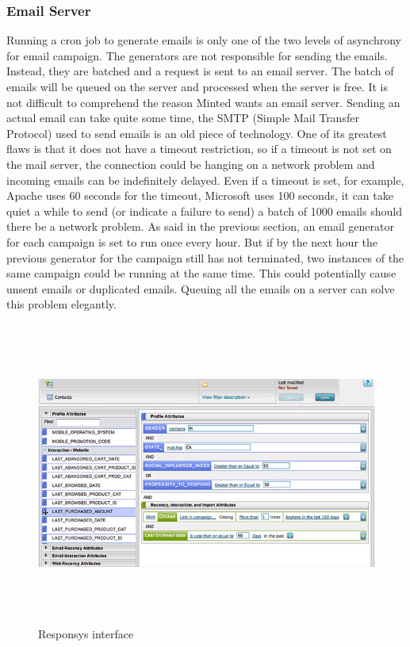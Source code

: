 \documentclass[12pt]{article}
\begin{document}
\subsubsection{Email Server}
Running a cron job to generate emails is only one of the two levels of asynchrony for email campaign. The generators are not responsible for sending the emails. Instead, they are batched and a request is sent to an email server. The batch of emails will be queued on the server and processed when the server is free. It is not difficult to comprehend the reason Minted wants an email server. Sending an actual email can take quite some time, the SMTP (Simple Mail Transfer Protocol) used to send emails is an old piece of technology. One of its greatest flaws is that it does not have a timeout restriction, so if a timeout is not set on the mail server, the connection could be hanging on a network problem and incoming emails can be indefinitely delayed. Even if a timeout is set, for example, Apache uses 60 seconds for the timeout, Microsoft uses 100 seconds,\cite{unit} \cite{maven} it can take quiet a while to send (or indicate a failure to send) a batch of 1000 emails should there be a network problem. As said in the previous section, an email generator for each campaign is set to run once every hour. But if by the next hour the previous generator for the campaign still has not terminated, two instances of the same campaign could be running at the same time. This could potentially cause unsent emails or duplicated emails. Queuing all the emails on a server can solve this problem elegantly.\\

\begin{figure}[ht!]
\centering
\includegraphics[width=12cm,height=10cm,keepaspectratio]{img/responsys.jpg}
\caption{Responsys interface}
\label{overflow}
\end{figure}
\end{document}
